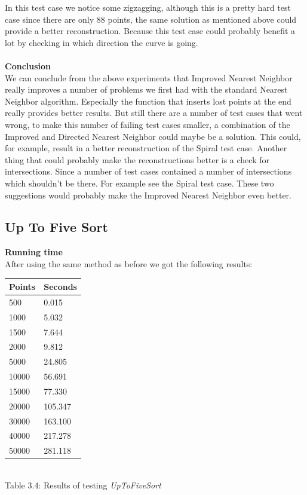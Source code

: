   \noindent In this test case we notice some zigzagging, although this is a pretty hard test case since there are only 88 points, the same solution as mentioned above could provide a better reconstruction. Because this test case could probably benefit a lot by checking in which direction the curve is going.\\\\
   \textbf{Conclusion}\\
   We can conclude from the above experiments that Improved Nearest Neighbor really improves a number of problems we first had with the standard Nearest Neighbor algorithm. Especially the function that inserts lost points at the end really provides better results. But still there are a number of test cases that went wrong, to make this number of failing test cases smaller, a combination of the Improved and Directed Nearest Neighbor could maybe be a solution. This could, for example, result in a better reconstruction of the Spiral test case. Another thing that could probably make the reconstructions better is a check for intersections. Since a number of test cases contained a number of intersections which shouldn't be there. For example see the Spiral test case.
   These two suggestions would probably make the Improved Nearest Neighbor even better.
\newpage
    \subsection{Up To Five Sort}
  \label{sub:utfs_test_results}
    \textbf{Running time}\\
    After using the same method as before we got the following results:
        \begin{center}
          \begin{tabular}{|p{2.5cm}|p{2.5cm}|}
              \hline
              Points & Seconds\\
              \hline
              \hline
              500 & 0.015\\
              \hline
              1000 & 5.032\\
              \hline
              1500 & 7.644\\
              \hline
              2000 & 9.812\\
              \hline
              5000 & 24.805\\
              \hline
              10000 & 56.691\\
              \hline
              15000 & 77.330\\
              \hline
              20000 & 105.347\\
              \hline
              30000 & 163.100\\
              \hline
              40000 & 217.278\\
              \hline
              50000 & 281.118\\
              \hline
          \end{tabular}
          \label{tab:utfs_runningtime}\\
          Table 3.4: Results of testing \textit{UpToFiveSort}
        \end{center}

